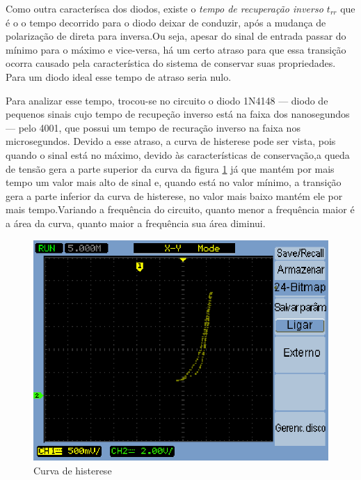 \documentclass[a4paper]{article} %
\begin{document}
Como outra caracterísca dos diodos, existe o \textit{tempo de recuperação inverso $t_{rr}$} que é o o tempo decorrido para o diodo deixar de conduzir, após a mudança de polarização de direta para inversa.Ou seja, apesar do sinal de entrada passar do mínimo para o máximo e vice-versa, há um certo atraso para que essa transição ocorra causado pela característica do sistema de conservar suas propriedades. Para um diodo ideal esse tempo de atraso seria nulo.

Para analizar esse tempo, trocou-se no circuito o diodo 1N4148 --- diodo de pequenos sinais cujo tempo de recupeção inverso está na faixa dos nanosegundos ---  pelo 4001, que possui um tempo de recuração inverso na faixa nos microsegundos. Devido a esse atraso, a curva de histerese pode ser vista, pois quando o sinal está no máximo, devido às características de conservação,a queda de tensão gera a parte superior da curva da figura \ref{fig:q1-his} já que mantém por mais tempo um valor mais alto de sinal e, quando está no valor mínimo, a transição gera a parte inferior da curva de histerese, no valor mais baixo mantém ele por mais tempo.Variando a frequência do circuito, quanto menor a frequência maior é a área da curva, quanto maior a frequência sua área diminui.


\begin{figure}[h]
\begin{centering}
\includegraphics[scale=0.7]{Imagens/3.1.opcional/opcio} \caption{Curva de histerese \label{fig:q1-his}}
\par\end{centering}
\end{figure}
\end{document}
